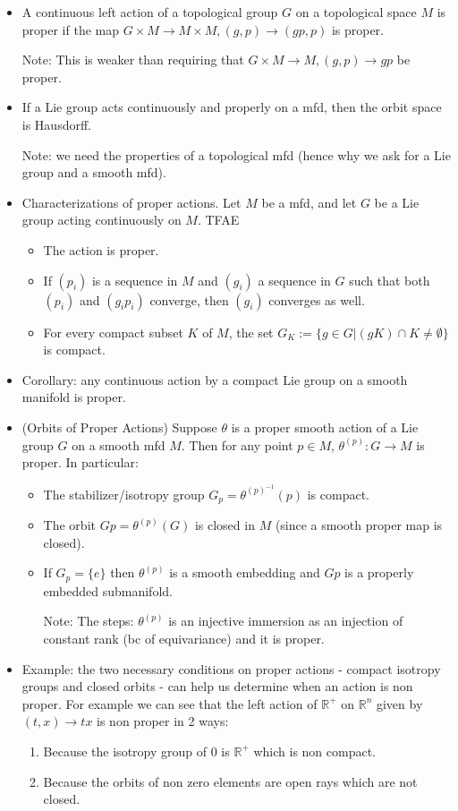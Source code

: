 \documentclass{report}
\theoremstyle{definition}
\begin{document}
\begin{itemize}
    \item A continuous left action of a topological group $G$ on a topological space $M$ is proper if the map $G\times M\to M\times M, (g,p)\to (gp,p)$ is proper.

    Note: This is weaker than requiring that $G\times M\to M,(g,p)\to gp$ be proper.
    \item If a Lie group acts continuously and properly on a mfd, then the orbit space is Hausdorff.

    Note: we need the properties of a topological mfd (hence why we ask for a Lie group and a smooth mfd).
    \item Characterizations of proper actions. Let $M$ be a mfd, and let $G$ be a Lie group acting continuously on $M$. TFAE
    \begin{itemize}
        \item The action is proper.
        \item If $(p_i)$ is a sequence in $M$ and $(g_i)$ a sequence in $G$ such that both $(p_i)$ and $(g_ip_i)$ converge, then $(g_i)$ converges as well.
        \item For every compact subset $K$ of $M$, the set $G_K:=\{g\in G|(gK)\cap K\neq\emptyset\}$ is compact.
    \end{itemize}
    \item Corollary: any continuous action by a compact Lie group on a smooth manifold is proper.
    \item (Orbits of Proper Actions) Suppose $\theta$ is a proper smooth action of a Lie group $G$ on a smooth mfd $M$. Then for any point $p\in M$, $\theta^{(p)}:G\to M$ is proper. In particular:
    \begin{itemize}
        \item The stabilizer/isotropy group $G_p=\theta^{(p)}^{-1}(p)$ is compact.
        \item The orbit $Gp=\theta^{(p)}(G)$ is closed in $M$ (since a smooth proper map is closed).
        \item If $G_p=\{e\}$ then $\theta^{(p)}$ is a smooth embedding and $Gp$ is a properly embedded submanifold.

        Note: The steps: $\theta^{(p)}$ is an injective immersion as an injection of constant rank (bc of equivariance) and it is proper.
    \end{itemize}
    \item Example: the two necessary conditions on proper actions - compact isotropy groups and closed orbits - can help us determine when an action is non proper. For example we can see that the left action of $\mathbb{R}^+$ on $\mathbb{R}^n$ given by $(t,x)\to tx$ is non proper in 2 ways:
    \begin{enumerate}
        \item Because the isotropy group of $0$ is $\mathbb{R}^+$ which is non compact.
        \item Because the orbits of non zero elements are open rays which are not closed.
    \end{enumerate}


\end{itemize}
\end{document}

